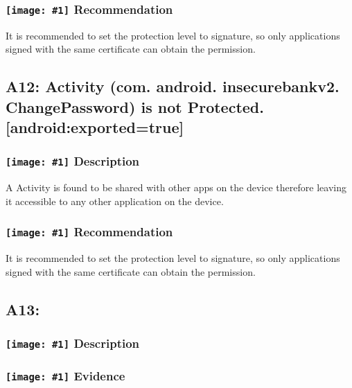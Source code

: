 \documentclass[12p]{article}
\newcommand{\icon}[1]{\texttt{[image: \#1]}}
\begin{document}
\subsubsection*{\protect\icon{/home/miki/Documents/GITHUB/AndroidPermissions/python/vulns/report_icons/basic_todo.png} Recommendation}
It is recommended to set the protection level to signature, so only applications signed with the same certificate can obtain the permission.
\subsection{A12: Activity (com. android. insecurebankv2. ChangePassword) is not Protected. [android:exported=true]}
\subsubsection*{\protect\icon{/home/miki/Documents/GITHUB/AndroidPermissions/python/vulns/report_icons/basic_sheet.png} Description}
A Activity is found to be shared with other apps on the device therefore leaving it accessible to any other application on the device.
\subsubsection*{\protect\icon{/home/miki/Documents/GITHUB/AndroidPermissions/python/vulns/report_icons/basic_todo.png} Recommendation}
It is recommended to set the protection level to signature, so only applications signed with the same certificate can obtain the permission.
\subsection{A13: }
\subsubsection*{\protect\icon{/home/miki/Documents/GITHUB/AndroidPermissions/python/vulns/report_icons/basic_sheet.png} Description}

\subsubsection*{\protect\icon{/home/miki/Documents/GITHUB/AndroidPermissions/python/vulns/report_icons/basic_magnifier.png} Evidence}

\end{document}
